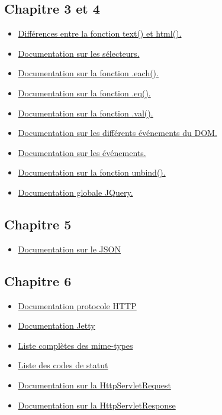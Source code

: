 \documentclass{article}[12pt]
\begin{document}
\subsection{Chapitre 3 et 4}
\begin{itemize}
	\item \href{http://stackoverflow.com/questions/1910794/what-is-the-difference-between-jquery-text-and-html}{Différences entre la fonction text() et html().}
    \item \href{http://api.jquery.com/category/selectors/}{Documentation sur les sélecteurs.}
    \item \href{http://api.jquery.com/each/}{Documentation sur la fonction .each().}
    \item \href{http://api.jquery.com/eq/}{Documentation sur la fonction .eq().}
    \item \href{http://api.jquery.com/val/}{Documentation sur la fonction .val().}
    \item \href{http://www.w3schools.com/jsref/dom_obj_event.asp}{Documentation sur les différents événements du DOM.}
    \item \href{http://api.jquery.com/category/events/}{Documentation sur les événements.}
    \item \href{http://api.jquery.com/unbind/}{Documentation sur la fonction unbind().}
    \item \href{https://api.jquery.com}{Documentation globale JQuery.}
\end{itemize}
\subsection{Chapitre 5}
\begin{itemize}
	\item \href{http://json.org}{Documentation sur le JSON} 
\end{itemize}
\subsection{Chapitre 6}
\begin{itemize}
	\item  \href{https://tools.ietf.org/html/rfc2616}{Documentation protocole HTTP}
    \item \href{http://www.eclipse.org/jetty/}{Documentation Jetty}
    \item \href{https://www.sitepoint.com/web-foundations/mime-types-complete-list/}{Liste complètes des mime-types}
    \item \href{https://www.w3.org/Protocols/rfc2616/rfc2616-sec10.html}{Liste des codes de statut}
    \item \href{http://docs.oracle.com/javaee/7/api/javax/servlet/http/HttpServletRequest.html}{Documentation sur la HttpServletRequest}
    \item \href{http://docs.oracle.com/javaee/7/api/javax/servlet/http/HttpServletResponse.html}{Documentation sur la HttpServletResponse}
\end{itemize}
\end{document}
